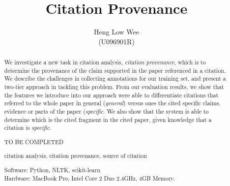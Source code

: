 \documentclass[hyp]{socreport}
\begin{document}
\title{Citation Provenance}
\author{Heng Low Wee \\ (U096901R)}
\maketitle
\begin{abstract}
\paragraph{}
We investigate a new task in citation analysis, {\it citation provenance}, which is to determine the provenance of the claim supported in the paper referenced in a citation. We describe the challenges in collecting annotations for our training set, and present a two-tier approach in tackling this problem.
 From our evaluation results, we show that the features we introduce into our approach were able to differentiate citations that referred to the whole paper in general ({\it general}) versus ones the cited specific claims, evidence or parts of the paper ({\it specific}.  We also show that the system is able to determine which is the cited fragment in the cited paper, given knowledge that a citation is {\it specific}.

\begin{descriptors}
	\item TO BE COMPLETED
\end{descriptors}
\begin{keywords}
	citation analysis, citation provenance, source of citation
\end{keywords}
\begin{implement}
\begin{flushleft}
\hspace{5 mm}Software: Python, NLTK, scikit-learn\\
\hspace{5 mm}Hardware: MacBook Pro, Intel Core 2 Duo 2.4GHz, 4GB Memory.
\end{flushleft}
\end{implement}
\end{abstract}
\end{document}
